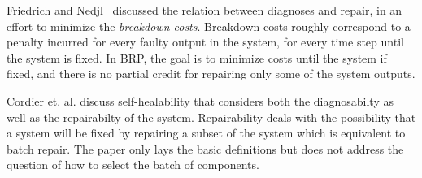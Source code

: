 \documentclass[letterpaper]{article}
\begin{document}

Friedrich and Nedjl~ discussed the relation between diagnoses and repair, in an effort to minimize the {\em breakdown costs}. Breakdown costs roughly correspond to a penalty incurred for every faulty output in the system, for every time step until the system is fixed. In BRP, the goal is to minimize costs until the system if fixed, and there is no partial credit for repairing only some of the system outputs.

Cordier et. al.  discuss self-healability that considers both the diagnosabilty as well as the repairabilty of the system. Repairability deals with the possibility that a system will be fixed by repairing a subset of the system which is equivalent to batch repair. The paper only lays the basic definitions but does not address the question of how to select the batch of components. 


\end{document}
